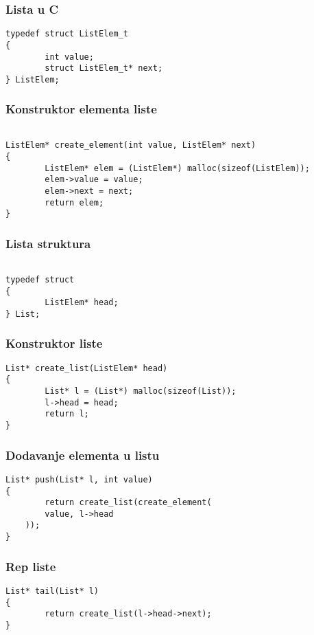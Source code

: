 \documentclass{beamer}
\begin{document}
\begin{frame}[fragile]
\frametitle{Lista u C}
\begin{lstlisting}
typedef struct ListElem_t
{
        int value;
        struct ListElem_t* next;
} ListElem;
\end{lstlisting}
\end{frame}

\begin{frame}[fragile]
\frametitle{Konstruktor elementa liste}
\begin{lstlisting}

ListElem* create_element(int value, ListElem* next)
{
        ListElem* elem = (ListElem*) malloc(sizeof(ListElem));
        elem->value = value;
        elem->next = next;
        return elem;
}

\end{lstlisting}
\end{frame}


\begin{frame}[fragile]
\frametitle{Lista struktura}
\begin{lstlisting}

typedef struct
{
        ListElem* head;
} List;

\end{lstlisting}
\end{frame}

\begin{frame}[fragile]
\frametitle{Konstruktor liste}
\begin{lstlisting}
List* create_list(ListElem* head)
{
        List* l = (List*) malloc(sizeof(List));
        l->head = head;
        return l;
}
\end{lstlisting}
\end{frame}


\begin{frame}[fragile]
\frametitle{Dodavanje elementa u listu}
\begin{lstlisting}
List* push(List* l, int value)
{
        return create_list(create_element(
		value, l->head
	));
}
\end{lstlisting}
\end{frame}

\begin{frame}[fragile]
\frametitle{Rep liste}
\begin{lstlisting}
List* tail(List* l)
{
        return create_list(l->head->next);
}
\end{lstlisting}
\end{frame}
\end{document}
